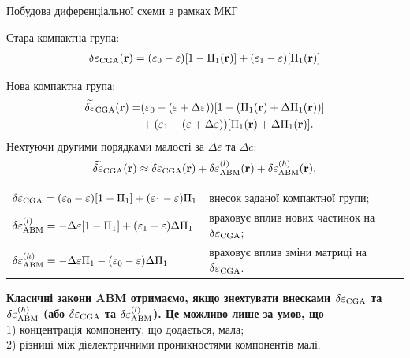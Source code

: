 \documentclass[10pt]{beamer}
\begin{document}
\begin{frame}{Побудова диференціальної схеми в рамках МКГ}
\footnotesize


Стара компактна група:
\begin{equation}\label{eq:delta-Brug}
\begin{split}
  {\delta\varepsilon}_{\rm CGA} ({\bf r}) = (\varepsilon_0 - \varepsilon) [1 - {\Pi}_1 ({\bf r})]+ (\varepsilon_1 - \varepsilon) [{\Pi}_1 ({\bf r})] 
\end{split}
\end{equation}

Нова компактна група:
\begin{equation}\label{eq:delta-Brug-diff0}
\begin{split}
  \widetilde{\delta\varepsilon}_{\rm CGA} ({\bf r}) =& (\varepsilon_0 - (\varepsilon + \Delta\varepsilon)) [1 - ({\Pi}_1 ({\bf r}) + \Delta{\Pi}_1 ({\bf r}))]\\
  &+ (\varepsilon_1 - (\varepsilon +   \Delta\varepsilon)) [{\Pi}_1 ({\bf r}) + \Delta{\Pi}_1 ({\bf r})] .
\end{split}
\end{equation}
Нехтуючи другими порядками малості за $\Delta\varepsilon$ та $\Delta c$:
\begin{equation}\label{eq:delta-Brug-diff}
\begin{split}
  \widetilde{\delta\varepsilon}_{\rm CGA} ({\bf r}) \approx \delta\varepsilon_{\rm CGA} ({\bf r})+ \delta\varepsilon_{\rm ABM}^{(l)} ({\bf r}) + \delta\varepsilon_{\rm ABM}^{(h)} ({\bf r}) ,
\end{split}
\end{equation}
\begin{tabular}{ ll } 
 $\delta\varepsilon_{\rm CGA} = (\varepsilon_0 - \varepsilon)[1 - \Pi_1] + (\varepsilon_1 - \varepsilon)\Pi_1$ & внесок заданої компактної групи;\\
 $\delta\varepsilon_{\rm ABM}^{(l)} = -\Delta\varepsilon [1 - \Pi_1] + (\varepsilon_1 - \varepsilon) \Delta\Pi_1$ & враховує вплив нових частинок на $\delta\varepsilon_{\rm CGA}$;\\
 $\delta\varepsilon_{\rm ABM}^{(h)} = -\Delta\varepsilon \Pi_1 - (\varepsilon_0 - \varepsilon)\Delta\Pi_1$ & враховує вплив зміни матриці на $\delta\varepsilon_{\rm CGA}$.
\end{tabular}

\textbf{Класичні закони ABM отримаємо, якщо знехтувати внесками $\delta\varepsilon_{\rm CGA}$ та $\delta\varepsilon_{\rm ABM}^{(h)}$ (або $\delta\varepsilon_{\rm CGA}$ та $\delta\varepsilon_{\rm ABM}^{(l)}$). Це можливо лише за умов, що}\\
1) концентрація компоненту, що додається, мала; \\
2) різниці між діелектричними проникностями компонентів малі.

\end{frame}
\end{document}
